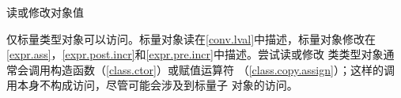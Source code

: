 读或修改对象值

\begin{note}[\noindent]
  仅标量类型对象可以访问。标量对象读在\ref{conv.lval}中描述，标量对象修改在
  \ref{expr.ass}，\ref{expr.post.incr}和\ref{expr.pre.incr}中描述。尝试读或修改
  类类型对象通常会调用构造函数（\ref{class.ctor}）或赋值运算符
  （\ref{class.copy.assign}）；这样的调用本身不构成访问，尽管可能会涉及到标量子
  对象的访问。
\end{note}
